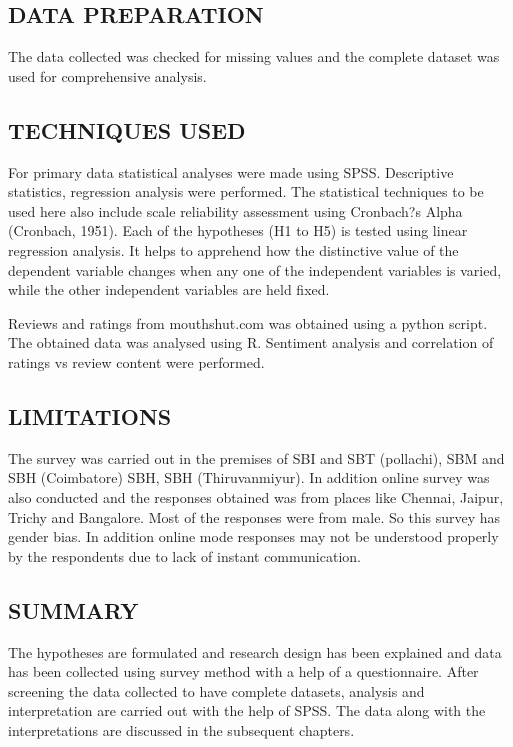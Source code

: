 \documentclass[a4paper, 14pt]{extarticle}
\begin{document}
{\subsection{DATA PREPARATION}
The data collected was checked for missing values and the complete dataset was used for comprehensive analysis.

\subsection{TECHNIQUES USED}
For primary data statistical analyses were made using SPSS. Descriptive statistics, regression analysis were performed. The statistical techniques to be used here also include scale reliability assessment using Cronbach?s Alpha (Cronbach, 1951). Each of the hypotheses (H1 to H5) is tested using linear regression analysis. It helps to apprehend how the distinctive value of the dependent variable changes when any one of the independent variables is varied, while the other independent variables are held fixed.

Reviews and ratings from mouthshut.com was obtained using a python script. The obtained data was analysed using R. Sentiment analysis and correlation of ratings vs review content were performed.
 

\subsection{LIMITATIONS}
The survey was carried out in the premises of SBI and SBT (pollachi), SBM and SBH (Coimbatore) SBH, SBH (Thiruvanmiyur). In addition online survey was also conducted and the responses obtained was from places like Chennai, Jaipur, Trichy and Bangalore. Most of the responses were from male. So this survey has gender bias. In addition online mode responses may not be understood properly by the respondents due to lack of instant communication. 

\subsection{SUMMARY}
The hypotheses are formulated and research design has been explained and data has been collected using survey method with a help of a questionnaire. After screening the data collected to have complete datasets, analysis and interpretation are carried out with the help of SPSS. The data along with the interpretations are discussed in the subsequent chapters.

\newpage
}
\end{document}
